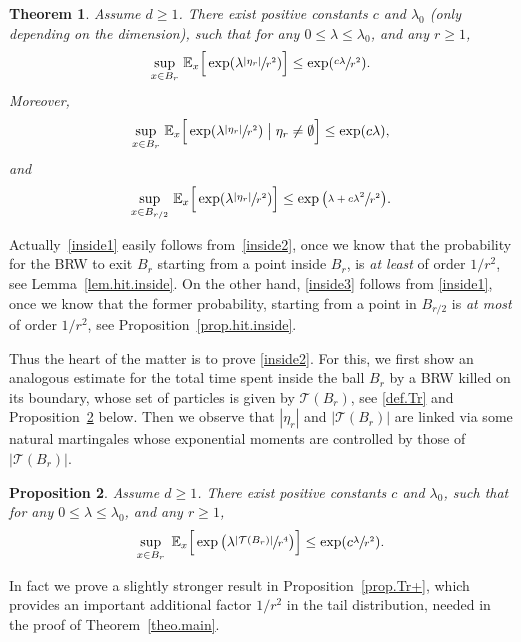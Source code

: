 \documentclass[11pt]{article}
\numberwithin{equation}{section}
\theoremstyle{plain}
\newtheorem{theorem}{Theorem}[section]
\newtheorem{proposition}[theorem]{Proposition}
\theoremstyle{definition}
\newcommand{\1}{{\text{\Large $\mathfrak 1$}}}
\begin{document}
\begin{theorem}\label{theo.inside}
Assume $d\ge 1$. There exist positive constants $c$ and $\lambda_0$ (only depending on the dimension), such that for any $0\le \lambda\le \lambda_0$, and any $r\ge 1$,
\begin{equation}\label{inside2}
\sup_{x\in B_r}\, \mathbb E_x\Big[\exp(\lambda \sfrac{|\eta_r|}{r^2})\Big]
\le \exp(\sfrac{c\lambda}{r^2}).
\end{equation}
Moreover,
\begin{equation}\label{inside1}
\sup_{x\in B_r} \, \mathbb E_x\Big[\exp(\lambda \sfrac{|\eta_r|}{r^2})\bigm| \eta_r\neq \emptyset\Big] \le \exp(c\lambda),
\end{equation}
and
\begin{equation}\label{inside3}
\sup_{x\in B_{r/2}} \, \mathbb E_x\Big[\exp(\lambda \sfrac{|\eta_r|}{r^2})
\Big] \le \exp\big(\sfrac{\lambda + c\lambda^2}{r^2}\big).
\end{equation}
\end{theorem}
Actually~\eqref{inside1} easily follows from~\eqref{inside2}, once we know that the probability for the BRW to exit $B_r$ starting from a point
inside $B_r$, is {\it at least} of order $1/r^2$, see Lemma~\ref{lem.hit.inside}. On the other hand, \eqref{inside3} follows from \eqref{inside1}, once we
know that the former probability, starting from a point in $B_{r/2}$ is
{\it at most} of order $1/r^2$, see Proposition~\ref{prop.hit.inside}.

Thus the heart of the matter is to prove \eqref{inside2}.
For this, we first show an analogous estimate for
the total time spent inside the ball $B_r$ by a BRW killed on its boundary,
whose set of particles is given by $\mathcal T(B_r)$,
see \eqref{def.Tr} and Proposition~\ref{prop.Tr} below.
Then we observe that $|\eta_r|$ and $|\mathcal T(B_r)|$
are linked via some natural martingales whose exponential moments are
controlled by those of $|\mathcal T(B_r)|$.
\begin{proposition}\label{prop.Tr}
Assume $d\ge 1$. There exist positive constants $c$ and $\lambda_0$,
such that for any $0\le \lambda\le \lambda_0$, and any $r\ge 1$,
\[
\sup_{x\in B_r}\ \mathbb E_x\Big[\exp\big(\lambda\sfrac{
|\mathbf{\mathcal T}(B_r)|}{r^4}\big)\Big]
\le\exp(c\sfrac{\lambda}{r^2}).
\]
\end{proposition}
In fact we prove a slightly stronger result
in Proposition~\ref{prop.Tr+}, which provides an important
additional factor $1/r^2$ in the tail distribution,
needed in the proof of Theorem~\ref{theo.main}.
\end{document}
